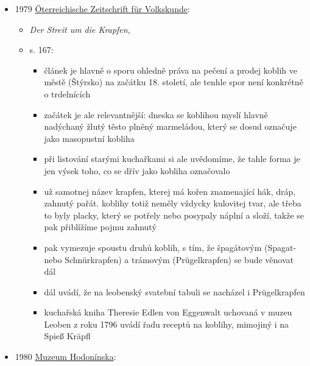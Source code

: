 \begin{itemize}
\begin{itemize}
    \begin{itemize}
    \tightlist
    \item
      1/2 kg hrubé mouky, 2 žloutky, 1/4 kg másla, trochu soli, trochu
      cukru, 5 dkg kvasnic a 1/4 l mléka
    \end{itemize}
  \end{itemize}
\item
  1979
  \href{https://www.volkskundemuseum.at/jart/prj3/volkskundemuseum/data/publikation/1524345942466/1524345942466.pdf}{Öterreichische
  Zeitschrift für Volkskunde}:

  \begin{itemize}
  \tightlist
  \item
    \emph{Der Streit um die Krapfen}, 
  \item
    s. 167:

    \begin{itemize}
    \tightlist
    \item
      článek je hlavně o sporu ohledně práva na pečení a prodej koblih
      ve městě  (Štýrsko) na začátku 18. století, ale
      tenhle spor není konkrétně o trdelnících
    \item
      začátek je ale relevantnější: dneska se koblihou myslí hlavně
      nadýchaný žlutý těsto plněný marmeládou, který se dosud označuje
      jako masopustní kobliha
    \item
      při listování starými kuchařkami si ale uvědomíme, že tahle forma
      je jen výsek toho, co se dřív jako kobliha označovalo
    \item
      už samotnej název krapfen, kterej má kořen znamenající hák, dráp,
      zahnutý pařát. koblihy totiž neměly vždycky kulovitej tvar, ale
      třeba to byly placky, který se potřely nebo posypaly náplní a
      složí, takže se pak přiblížíme pojmu zahnutý
    \item
      pak vymezuje spoustu druhů koblih, s tím, že špagátovým (Spagat-
      nebo Schnürkrapfen) a trámovým (Prügelkrapfen) se bude věnovat dál
    \item
      dál uvádí, že na leobenský svatební tabuli se nacházel i
      Prügelkrapfen
    \item
      kuchařská kniha Theresie Edlen von Eggenwalt uchovaná v muzeu
      Leoben z roku 1796 uvádí řadu receptů na koblihy, mimojiný i na
      Spieß Kräpfl
    \end{itemize}
  \end{itemize}
\item
  1980
  \href{https://ceskadigitalniknihovna.cz/uuid/uuid:c9416770-a264-41ee-9b5f-6d74a6a748aa}{Muzeum
  Hodonínska}:


\end{itemize}
